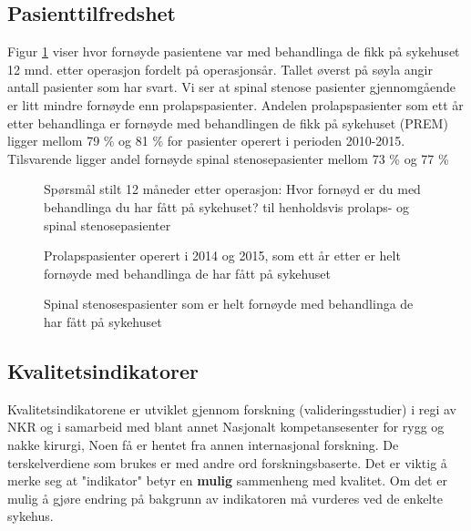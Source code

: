 \subsection{Pasienttilfredshet}

Figur \ref{fig:Fornoyd} viser hvor fornøyde pasientene var med behandlinga de fikk på sykehuset 12 mnd. 
etter operasjon fordelt på operasjonsår. Tallet øverst på søyla angir antall pasienter som har svart. Vi ser at spinal stenose pasienter gjennomgående er litt mindre fornøyde enn prolapspasienter.
Andelen prolapspasienter som ett år etter behandlinga er fornøyde med behandlingen de fikk på sykehuset (PREM) ligger mellom 79 \% og 81 \% for pasienter operert i perioden 2010-2015. 
Tilsvarende ligger andel fornøyde spinal stenosepasienter mellom 73 \% og 77 \%



\begin{figure}[h] 
\begin{center}
\end{center}
\caption{Spørsmål stilt 12 måneder etter operasjon: Hvor fornøyd er du med behandlinga du har fått på sykehuset? til henholdsvis prolaps- og spinal stenosepasienter}
\label{fig:Fornoyd}
\end{figure}

\begin{figure}[h] 
\caption{Prolapspasienter operert i 2014 og 2015, som ett år etter er helt fornøyde med behandlinga de har fått på sykehuset}
\label{fig:FornoydAvdPro}
\end{figure}

\begin{figure}[h] 
\caption{Spinal stenosespasienter som er helt fornøyde med behandlinga de har fått på sykehuset}
\label{fig:FornoydAvdSS}
\end{figure}




\subsection{Kvalitetsindikatorer}

Kvalitetsindikatorene er  utviklet gjennom forskning (valideringsstudier)  i regi av NKR og i samarbeid med blant annet Nasjonalt kompetansesenter for rygg og nakke kirurgi, Noen få er hentet fra annen internasjonal forskning.  De terskelverdiene som brukes er med andre ord forskningsbaserte. Det er viktig å merke seg at "indikator" betyr en \textbf{mulig} sammenheng med kvalitet. Om det er mulig å gjøre endring på bakgrunn av indikatoren må vurderes ved de enkelte sykehus.

